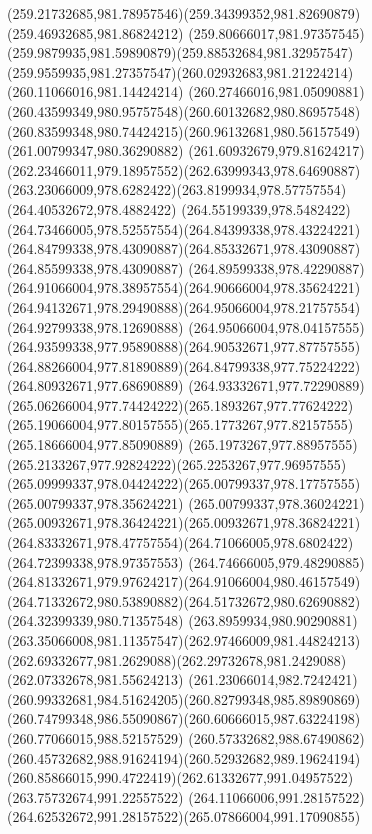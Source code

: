 {    \curveto(259.21732685,981.78957546)(259.34399352,981.82690879)(259.46932685,981.86824212)
    \curveto(259.80666017,981.97357545)(259.9879935,981.59890879)(259.88532684,981.32957547)
    \curveto(259.9559935,981.27357547)(260.02932683,981.21224214)(260.11066016,981.14424214)
    \curveto(260.27466016,981.05090881)(260.43599349,980.95757548)(260.60132682,980.86957548)
    \curveto(260.83599348,980.74424215)(260.96132681,980.56157549)(261.00799347,980.36290882)
    \curveto(261.60932679,979.81624217)(262.23466011,979.18957552)(262.63999343,978.64690887)
    \curveto(263.23066009,978.6282422)(263.8199934,978.57757554)(264.40532672,978.4882422)
    \curveto(264.55199339,978.5482422)(264.73466005,978.52557554)(264.84399338,978.43224221)
    \curveto(264.84799338,978.43090887)(264.85332671,978.43090887)(264.85599338,978.43090887)
    \curveto(264.89599338,978.42290887)(264.91066004,978.38957554)(264.90666004,978.35624221)
    \curveto(264.94132671,978.29490888)(264.95066004,978.21757554)(264.92799338,978.12690888)
    \curveto(264.95066004,978.04157555)(264.93599338,977.95890888)(264.90532671,977.87757555)
    \curveto(264.88266004,977.81890889)(264.84799338,977.75224222)(264.80932671,977.68690889)
    \curveto(264.93332671,977.72290889)(265.06266004,977.74424222)(265.1893267,977.77624222)
    \curveto(265.19066004,977.80157555)(265.1773267,977.82157555)(265.18666004,977.85090889)
    \curveto(265.1973267,977.88957555)(265.2133267,977.92824222)(265.2253267,977.96957555)
    \curveto(265.09999337,978.04424222)(265.00799337,978.17757555)(265.00799337,978.35624221)
    \curveto(265.00799337,978.36024221)(265.00932671,978.36424221)(265.00932671,978.36824221)
    \curveto(264.83332671,978.47757554)(264.71066005,978.6802422)(264.72399338,978.97357553)
    \curveto(264.74666005,979.48290885)(264.81332671,979.97624217)(264.91066004,980.46157549)
    \curveto(264.71332672,980.53890882)(264.51732672,980.62690882)(264.32399339,980.71357548)
    \curveto(263.8959934,980.90290881)(263.35066008,981.11357547)(262.97466009,981.44824213)
    \curveto(262.69332677,981.2629088)(262.29732678,981.2429088)(262.07332678,981.55624213)
    \curveto(261.23066014,982.7242421)(260.99332681,984.51624205)(260.82799348,985.89890869)
    \curveto(260.74799348,986.55090867)(260.60666015,987.63224198)(260.77066015,988.52157529)
    \curveto(260.57332682,988.67490862)(260.45732682,988.91624194)(260.52932682,989.19624194)
    \curveto(260.85866015,990.4722419)(262.61332677,991.04957522)(263.75732674,991.22557522)
    \curveto(264.11066006,991.28157522)(264.62532672,991.28157522)(265.07866004,991.17090855)
}

